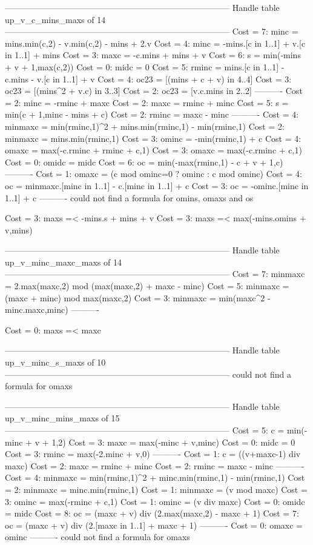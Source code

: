 --------------------------------------------------------------------------------
Handle table up_v_c_mins_maxs of 14
--------------------------------------------------------------------------------
Cost =  7:  minc    = mins.min(c,2) - v.min(c,2) - mins + 2.v
Cost =  4:  minc    = -mins.[c in 1..1] + v.[c in 1..1] + mins
Cost =  3:  maxc    = -c.mins + mins + v
Cost =  6:  s       = min(-mins + v + 1,max(c,2))
Cost =  0:  midc    = 0
Cost =  5:  rminc   = mins.[c in 1..1] - c.mins - v.[c in 1..1] + v
Cost =  4:  oc23    = [(mins + c + v) in 4..4]
Cost =  3:  oc23    = [(mins^2 + v.c) in 3..3]
Cost =  2:  oc23    = [v.c.mins in 2..2]
----------
Cost =  2:  minc    = -rminc + maxc
Cost =  2:  maxc    = rminc + minc
Cost =  5:  s       = min(c + 1,minc - mins + c)
Cost =  2:  rminc   = maxc - minc
----------
Cost =  4:  minmaxc = min(rminc,1)^2 + mins.min(rminc,1) - min(rminc,1)
Cost =  2:  minmaxc = mins.min(rminc,1)
Cost =  3:  ominc   = -min(rminc,1) + c
Cost =  4:  omaxc   = max(-c.rminc + rminc + c,1)
Cost =  3:  omaxc   = max(-c.rminc + c,1)
Cost =  0:  omidc   = midc
Cost =  6:  oc      = min(-max(rminc,1) - c + v + 1,c)
----------
Cost =  1:  omaxc   = (c mod ominc=0 ? ominc : c mod ominc)
Cost =  4:  oc      = minmaxc.[minc in 1..1] - c.[minc in 1..1] + c
Cost =  3:  oc      = -ominc.[minc in 1..1] + c
----------
could not find a formula for omins, omaxs and os

Cost =  3:  maxs =< -mins.s + mins + v
Cost =  3:  maxs =< max(-mins.omins + v,mins)

--------------------------------------------------------------------------------
Handle table up_v_minc_maxc_maxs of 14
--------------------------------------------------------------------------------
Cost =  7:  minmaxc = 2.max(maxc,2) mod (max(maxc,2) + maxc - minc)
Cost =  5:  minmaxc = (maxc + minc) mod max(maxc,2)
Cost =  3:  minmaxc = min(maxc^2 - minc.maxc,minc)
----------

Cost =  0:  maxs =< maxc

--------------------------------------------------------------------------------
Handle table up_v_minc_s_maxs of 10
--------------------------------------------------------------------------------
could not find a formula for omaxs


--------------------------------------------------------------------------------
Handle table up_v_minc_mins_maxs of 15
--------------------------------------------------------------------------------
Cost =  5:  c       = min(-minc + v + 1,2)
Cost =  3:  maxc    = max(-minc + v,minc)
Cost =  0:  midc    = 0
Cost =  3:  rminc   = max(-2.minc + v,0)
----------
Cost =  1:  c       = ((v+maxc-1) div maxc)
Cost =  2:  maxc    = rminc + minc
Cost =  2:  rminc   = maxc - minc
----------
Cost =  4:  minmaxc = min(rminc,1)^2 + minc.min(rminc,1) - min(rminc,1)
Cost =  2:  minmaxc = minc.min(rminc,1)
Cost =  1:  minmaxc = (v mod maxc)
Cost =  3:  ominc   = max(-rminc + c,1)
Cost =  1:  ominc   = (v div maxc)
Cost =  0:  omidc   = midc
Cost =  8:  oc      = (maxc + v) div (2.max(maxc,2) - maxc + 1)
Cost =  7:  oc      = (maxc + v) div (2.[maxc in 1..1] + maxc + 1)
----------
Cost =  0:  omaxc   = ominc
----------
could not find a formula for omaxs


